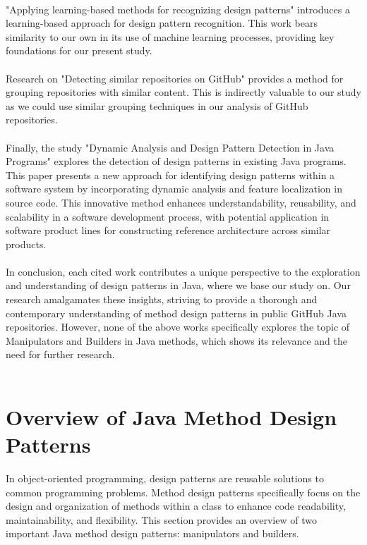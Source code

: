 \documentclass[draft]{article}
\begin{document}
~\\
"{}Applying learning-based methods for recognizing design patterns"{} \cite{ref6} introduces a learning-based approach for design pattern recognition. This work bears similarity to our own in its use of machine learning processes, providing key foundations for our present study.\\
~\\
Research on "{}Detecting similar repositories on GitHub"{} \cite{ref7} provides a method for grouping repositories with similar content. This is indirectly valuable to our study as we could use similar grouping techniques in our analysis of GitHub repositories.\\
~\\
Finally, the study "{}Dynamic Analysis and Design Pattern Detection in Java Programs"{}\cite{ref8} explores the detection of design patterns in existing Java programs. This paper presents a new approach for identifying design patterns within a software system by incorporating dynamic analysis and feature localization in source code. This innovative method enhances understandability, reusability, and scalability in a software development process, with potential application in software product lines for constructing reference architecture across similar products.\\
~\\
In conclusion, each cited work contributes a unique perspective to the exploration and understanding of design patterns in Java, where we base our study on. Our research amalgamates these insights, striving to provide a thorough and contemporary understanding of method design patterns in public GitHub Java repositories. However, none of the above works specifically explores the topic of Manipulators and Builders in Java methods, which shows its relevance and the need for further research.\\


~\\

\newpage
\section{Overview of Java Method Design Patterns}
In object-oriented programming, design patterns are reusable solutions to common programming problems. Method design patterns specifically focus on the design and organization of methods within a class to enhance code readability, maintainability, and flexibility. This section provides an overview of two important Java method design patterns: manipulators and builders.
\end{document}
